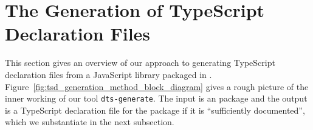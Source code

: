 \documentclass[english,cleveref,autoref,submission]{programming}
\newcommand{\figref}[1]{Figure~\ref{#1}}
\begin{document}












\section{The Generation of TypeScript Declaration Files}
\label{sec:gener-typescr-decl}
This section gives an overview of our approach to generating
TypeScript declaration files from a JavaScript library packaged in
\NPM. \figref{fig:tsd_generation_method_block_diagram} gives a rough
picture of the inner working of our tool \texttt{dts-generate}. The
input is an \NPM{} package and the output is a TypeScript declaration
file for the package if it is ``sufficiently documented'', which we
substantiate in the next subsection.
\end{document}
